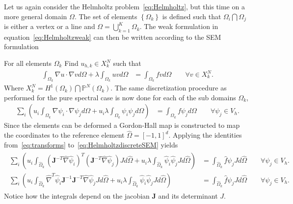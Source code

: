 Let us again consider the Helmholtz problem~\ref{eq:Helmholtz}, but this time 
on a more general domain $\Omega$. The set of elements $\left\{ \Omega_k \right\}$
is defined such that $\Omega_i\bigcap\Omega_j$ is either a vertex or a line and 
$\Omega = \bigcup^K_{k=1}\Omega_k$.
The weak formulation in equation~\ref{eq:Helmholtzweak} can then be written according 
to the SEM formulation

For all elements $\Omega_k$ Find $u_{h,k}\in X^N_k$  such that
%
\begin{align}
    \int_{\Omega_k}\nabla u \cdot \nabla v d \Omega + \lambda \int_{\Omega_k} u vd \Omega 
    &= \int_{\Omega_k}f vd \Omega \qquad \forall v \in X_k^N.
    \label{eq:HelmholtzweakSEM}
\end{align}
%
Where $X^N_k =  H^1(\Omega_k)\bigcap\mathbb{P}^N(\Omega_k)$. The same discretization 
procedure as performed for the pure spectral case is now done for each of the 
sub domains $\Omega_k$,
%
\begin{align}
    \sum_i\left(  u_i\int_{\Omega_k}\nabla \psi_i \cdot \nabla \psi_j d \Omega + 
    u_i\lambda \int_{\Omega_k} \psi_i \psi_jd \Omega \right)
    &= \int_{\Omega_k}f \psi_jd \Omega \qquad \forall \psi_j \in V_h.
    \label{eq:HelmholtzdiscreteSEM}
\end{align}
%
Since the elements can be deformed a Gordon-Hall map is 
constructed to map the coordinates to the reference element $\hat{\Omega}=[-1,1]^d$.
Applying the identities from~\ref{eq:transforms} to~\ref{eq:HelmholtzdiscreteSEM} yields
%
\begin{align}
    \begin{split}
    \sum_i\left(  u_i\int_{\hat{\Omega}_k}(\mathbf{J}^{-T}\hat{\nabla} \hat{\psi}_i)^T
    (\mathbf{J}^{-T}\hat{\nabla} \hat{\psi}_j) J d \hat{\Omega} + 
    u_i\lambda \int_{\hat{\Omega}_k} \hat{\psi}_i \hat{\psi}_j Jd \hat{\Omega} \right)
    &= \int_{\hat{\Omega}_k}\hat{f} \psi_j J d \hat{\Omega} \qquad \forall \psi_j \in V_h.  \\
    \sum_i\left(  u_i\int_{\hat{\Omega}_k}\hat{\nabla}^T \hat{\psi}_i\mathbf{J}^{-1}
    \mathbf{J}^{-T}\hat{\nabla} \hat{\psi}_j J d \hat{\Omega} + 
    u_i\lambda \int_{\hat{\Omega}_k} \hat{\psi}_i \hat{\psi}_j Jd \hat{\Omega} \right)
    &= \int_{\hat{\Omega}_k}\hat{f} \psi_j J d \hat{\Omega} \qquad \forall \psi_j \in V_h.
    \end{split}
    \label{eq:HelmholtzrefSEM}
\end{align}
%
Notice how the integrals depend on the jacobian $\mathbf{J}$ and its determinant $J$.

